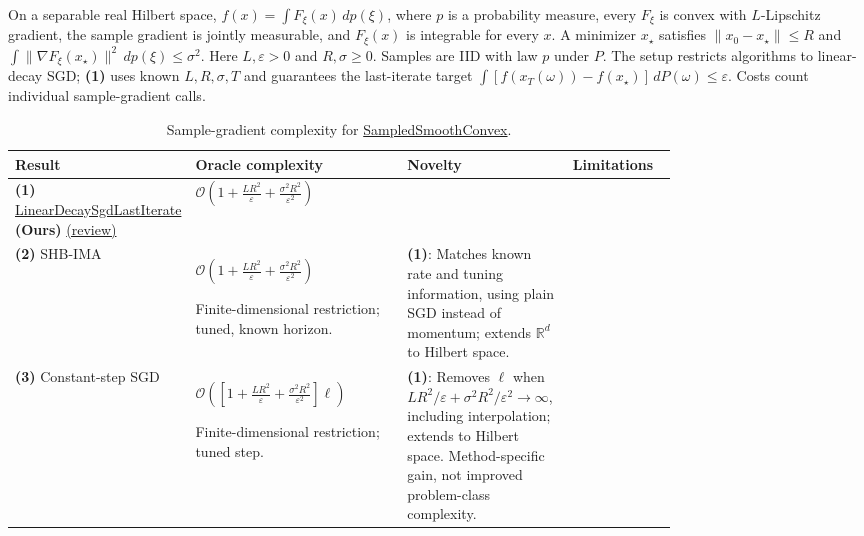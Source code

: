 \begin{table}[tp]
\centering
\caption{Sample-gradient complexity for \href{https://github.com/k3nfalt/longtails/blob/main/LongTails/Setups/SampledSmoothConvex.lean}{SampledSmoothConvex}.}\label{tab:SampledSmoothConvex}
\parbox{\linewidth}{\footnotesize On a separable real Hilbert space, $f(x)=\int F_\xi(x)\,dp(\xi)$, where $p$ is a probability measure, every $F_\xi$ is convex with $L$-Lipschitz gradient, the sample gradient is jointly measurable, and $F_\xi(x)$ is integrable for every $x$. A minimizer $x_\star$ satisfies $\|x_0-x_\star\|\le R$ and $\int\|\nabla F_\xi(x_\star)\|^2\,dp(\xi)\le\sigma^2$. Here $L,\varepsilon>0$ and $R,\sigma\ge0$. Samples are IID with law $p$ under $P$. The setup restricts algorithms to linear-decay SGD; \textbf{(1)} uses known $L,R,\sigma,T$ and guarantees the last-iterate target $\int[f(x_T(\omega))-f(x_\star)]\,dP(\omega)\le\varepsilon$. Costs count individual sample-gradient calls.}\par\smallskip
\begin{threeparttable}
\footnotesize
\setlength{\tabcolsep}{4pt}\renewcommand{\arraystretch}{1.25}
\begin{tabularx}{\linewidth}{@{}>{\raggedright\arraybackslash}p{0.20\linewidth}>{\raggedright\arraybackslash}p{0.32\linewidth}>{\raggedright\arraybackslash}p{0.25\linewidth}>{\raggedright\arraybackslash}X@{}}
\toprule
\textbf{Result} & \textbf{Oracle complexity} & \textbf{Novelty} & \textbf{Limitations} \\
\midrule
\textbf{(1)} \href{https://github.com/k3nfalt/longtails/blob/main/LongTails/Theorems/LinearDecaySgdLastIterate.lean}{Linear\allowbreak Decay\allowbreak Sgd\allowbreak Last\allowbreak Iterate} \textbf{(Ours)} \href{https://github.com/k3nfalt/longtails/blob/main/scripts/reviews/LinearDecaySgdLastIterate.md}{(review)} & $\mathcal{O}\!\left(1+\frac{LR^2}{\varepsilon}+\frac{\sigma^2R^2}{\varepsilon^2}\right)$ &  &  \\
\midrule[1.2pt]
\textbf{(2)} SHB-IMA \citep[Thm.~G.1, Cor.~G.2]{sscSebbouh2021v2} & $\mathcal{O}\!\left(1+\frac{LR^2}{\varepsilon}+\frac{\sigma^2R^2}{\varepsilon^2}\right)$\par Finite-dimensional restriction; tuned, known horizon. & \textbf{(1)}: Matches known rate and tuning information, using plain SGD instead of momentum; extends $\mathbb{R}^d$ to Hilbert space. &  \\
\midrule
\textbf{(3)} Constant-step SGD \citep[Thm.~2]{csrrAttia2025v2} & $\mathcal{O}\!\left(\left[1+\frac{LR^2}{\varepsilon}+\frac{\sigma^2R^2}{\varepsilon^2}\right]\ell\right)$\par Finite-dimensional restriction; tuned step. & \textbf{(1)}: Removes $\ell$ when $LR^2/\varepsilon+\sigma^2R^2/\varepsilon^2\to\infty$, including interpolation; extends to Hilbert space. Method-specific gain, not improved problem-class complexity. &  \\

\end{tabularx}
\end{threeparttable}
\end{table}
